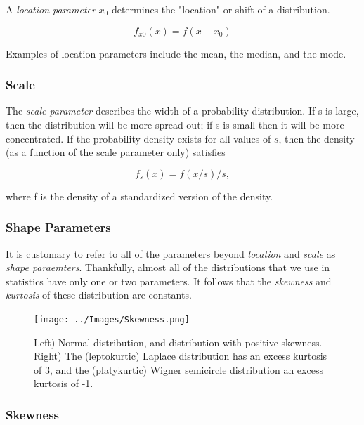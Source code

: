 A \emph{location parameter} $x_0$  determines the "location" or shift of a distribution.

\begin{equation*}
  f_{x0}(x)=f(x-x_0)
\end{equation*}

Examples of location parameters include the mean, the median, and the mode.

\subsubsection{Scale}

The \emph{scale parameter} describes the width of a probability distribution.  If s is large, then the distribution will be more spread out; if s is small then it will be more concentrated. If the probability density exists for all values of $s$, then the density (as a function of the scale parameter only) satisfies

\begin{equation*}
   f_s(x) = f(x/s)/s,
\end{equation*}

where f is the density of a standardized version of the density.

\subsubsection{Shape Parameters}

It is customary to refer to all of the parameters beyond \emph{location} and \emph{scale} as \emph{shape paraemters}. Thankfully, almost all of the distributions that we use in statistics have only one or two parameters. It follows that the \emph{skewness }and \emph{kurtosis} of these distribution are constants.

\begin{figure}
  \centering
  \texttt{[image: ../Images/Skewness.png]}\\
  \caption{Left) Normal distribution, and distribution with positive skewness. Right) The (leptokurtic) Laplace distribution has an excess kurtosis of 3, and the (platykurtic) Wigner semicircle distribution an excess kurtosis of -1.}\label{fig:skewkurtosis}
\end{figure}

\subsubsection{Skewness}

